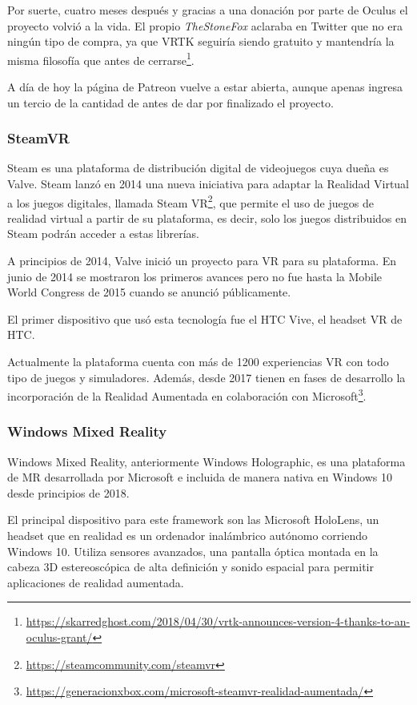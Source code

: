 Por suerte, cuatro meses después y gracias a una donación por parte de Oculus el proyecto volvió a la vida. El propio \textit{TheStoneFox} aclaraba en Twitter que no era ningún tipo de compra, ya que \acs{VRTK} seguiría siendo gratuito y mantendría la misma filosofía que antes de cerrarse\footnote{\url{https://skarredghost.com/2018/04/30/vrtk-announces-version-4-thanks-to-an-oculus-grant/}}.

A día de hoy la página de Patreon vuelve a estar abierta, aunque apenas ingresa un tercio de la cantidad de antes de dar por finalizado el proyecto.

\subsubsection{SteamVR}

Steam es una plataforma de distribución digital de videojuegos cuya dueña es Valve. Steam lanzó en 2014 una nueva iniciativa para adaptar la Realidad Virtual a los juegos digitales, llamada Steam VR\footnote{\url{https://steamcommunity.com/steamvr}}, que permite el uso de juegos de realidad virtual a partir de su plataforma, es decir, solo los juegos distribuidos en Steam podrán acceder a estas librerías.

A principios de  2014, Valve inició un proyecto para \acs{VR} para su plataforma. En junio de 2014 se mostraron los primeros avances pero no fue hasta la Mobile World Congress de 2015 cuando se anunció públicamente. 

El primer dispositivo que usó esta tecnología fue el HTC Vive, el headset \acs{VR} de HTC.

Actualmente la plataforma cuenta con más de 1200 experiencias \acs{VR} con todo tipo de juegos y simuladores. Además, desde 2017 tienen en fases de desarrollo la incorporación de la Realidad Aumentada en colaboración con Microsoft\footnote{\url{https://generacionxbox.com/microsoft-steamvr-realidad-aumentada/}}.

\subsubsection{Windows Mixed Reality}

Windows Mixed Reality, anteriormente Windows Holographic, es una plataforma de \acs{MR} desarrollada por Microsoft e incluida de manera nativa en Windows 10 desde principios de 2018.

El principal dispositivo para este framework son las Microsoft HoloLens, un headset que en realidad es un ordenador inalámbrico autónomo corriendo Windows 10. Utiliza sensores avanzados, una pantalla óptica montada en la cabeza 3D estereoscópica de alta definición y sonido espacial para permitir aplicaciones de realidad aumentada.

